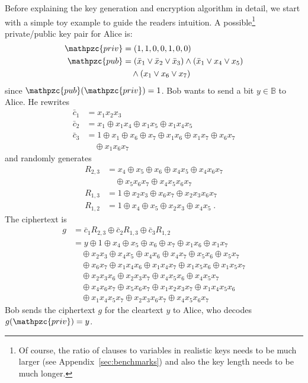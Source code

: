 \documentclass[final,journal,compsoc]{IEEEtran}
\newcommand{\priv}{\mathpzc{priv}}
\newcommand{\pub}{\mathpzc{pub}}
\begin{document}
Before explaining the key generation and encryption algorithm in
detail, we start with a simple toy example to guide the readers
intuition.  A possible\footnote{Of course, the ratio of clauses to variables in
realistic keys needs to be much larger (see Appendix~\ref{sec:benchmarks}) and also the key length needs
to be much longer.} private/public key pair for Alice is:
\begin{align}
  \priv & = (1,1,0,0,1,0,0)\\
  \pub & =
(\bar x_1 \vee \bar x_2 \vee \bar  x_3) \wedge
( \bar x_1 \vee  x_4  \vee x_5) \\&\quad \wedge
( x_1 \vee  x_6 \vee  x_7)
\,
\end{align}
since $\pub(\priv)=1$. Bob wants to send a bit $y\in\mathbb B$ to
Alice. He rewrites
\begin{align}
\bar c_1 &= x_1  x_2  x_3
\\
\bar c_2 &= x_1  \oplus x_1 x_4 \oplus x_1 x_5  \oplus x_1x_4x_5 \\
\bar c_3 &= 1\oplus x_1 \oplus x_6 \oplus x_7 \oplus x_1x_6 \oplus
x_1x_7 \oplus x_6  x_7  \\&\quad \oplus x_1x_6x_7 
\end{align}
and randomly generates
\begin{align}
R_{2,3}&= 
x_4 \oplus x_5 \oplus x_6 \oplus x_4x_5 \oplus x_4x_6x_7 \\&\quad \oplus
x_5x_6x_7
\oplus x_4x_5x_6x_7
\\
R_{1,3} &=
1\oplus x_2x_3 \oplus x_6x_7 \oplus x_2x_3x_6x_7
\\
R_{1,2}&= 
1\oplus x_4 \oplus x_5 \oplus x_2x_3 \oplus x_4x_5
\;.
\end{align}
The ciphertext is
\begin{subequations}
\begin{align}
g &= \bar c_1 R_{2,3} \oplus \bar c_2 R_{1,3} \oplus \bar c_3 R_{1,2}
\\&=y \oplus 1 \oplus
x_4 \oplus x_5 \oplus x_6 \oplus x_7 \oplus x_1x_6 \oplus x_1x_7
\\&\quad
\oplus x_2x_3 
\oplus x_4x_5 \oplus x_4x_6 
\oplus x_4x_7 \oplus x_5x_6 \oplus x_5x_7 
\\&\quad
\oplus x_6x_7 \oplus
x_1x_4x_6 \oplus x_1x_4x_7 \oplus x_1x_5x_6 \oplus x_1x_5x_7 
\\&\quad
\oplus x_2x_3x_6 \oplus x_2x_3x_7 \oplus x_4x_5x_6 \oplus x_4x_5x_7
\\&\quad
\oplus x_4x_6x_7 \oplus x_5x_6x_7 \oplus x_1x_2x_3x_7 
\oplus x_1x_4x_5x_6 
\\&\quad
\oplus x_1x_4x_5x_7 \oplus x_2x_3x_6x_7 \oplus x_4x_5x_6x_7
\end{align}
\end{subequations}
Bob sends the ciphertext $g$ for the cleartext $y$ to Alice, who decodes $g(\priv)=y$.
\end{document}
